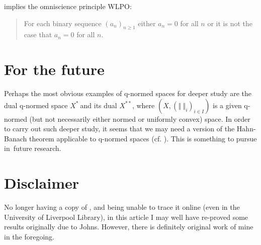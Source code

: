 \documentclass[11pt]{article}%
\begin{document}
%

\noindent
implies the omniscience principle \textsf{WLPO}:

\begin{quote}
For each binary sequence $\left(  a_{n}\right)  _{n\geq1}$ either $a_{n}=0$
for all $n$ or it is not the case that $a_{n}=0$ for all $n$.
\end{quote}

\section{For the future}

Perhaps the most obvious examples of q-normed spaces for deeper study are the
dual q-normed space $X^{\ast}\ $and its dual $X^{\ast\ast}$, where $\left(
X,\left(  \left\Vert \ \right\Vert _{i}\right)  _{i\in I}\right)  $ is a given
q-normed (but not necessarily either normed or uniformly convex) space. In
order to carry out such deeper study, it seems that we may need a version of
the Hahn-Banach theorem applicable to q-normed spaces (cf. \cite{Ishihara2}).
This is something to pursue in\ future research.%

\bigskip


\section{Disclaimer}

No longer having a copy of \cite{Johns}, and being unable to trace it online
(even in the University of Liverpool Library), in this article I may well have
re-proved some results originally due to Johns. However, there is definitely
original work of mine in the foregoing.%

\bigskip
%

\bigskip
\end{document}
